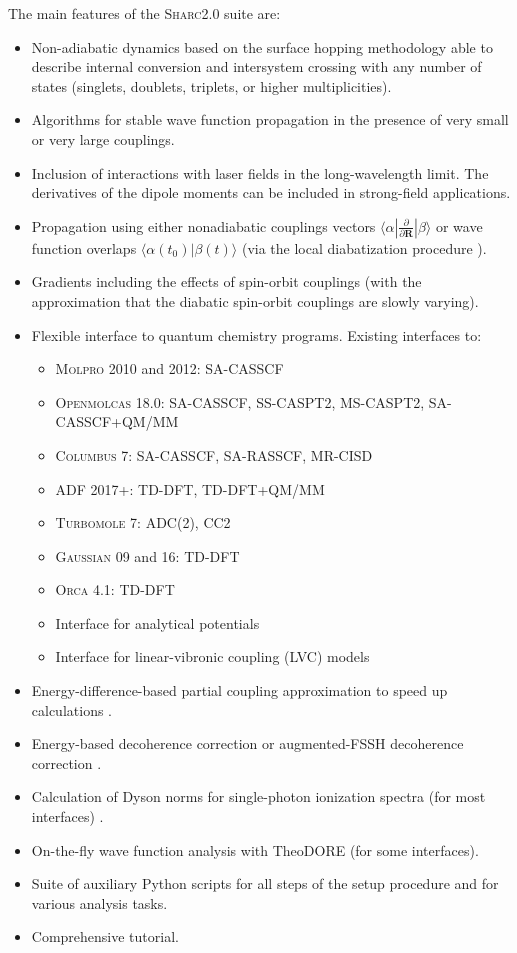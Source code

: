 \documentclass[a4paper,10pt,DIV=15,openany]{scrbook}
\newcommand{\sharc}{\textsc{Sharc}}
\begin{document}
The main features of the \sharc{}2.0 suite are:
\begin{itemize}
  \item Non-adiabatic dynamics based on the surface hopping methodology able to describe internal conversion and intersystem crossing with any number of states (singlets, doublets, triplets, or higher multiplicities).
  \item Algorithms for stable wave function propagation in the presence of very small or very large couplings.
  \item Inclusion of interactions with laser fields in the long-wavelength limit. The derivatives of the dipole moments can be included in strong-field applications.
  \item Propagation using either nonadiabatic couplings vectors $\langle\alpha|\frac{\partial}{\partial \mathbf{R}}|\beta\rangle$ or wave function overlaps $\langle\alpha(t_0)|\beta(t)\rangle$ (via the local diabatization procedure \cite{Granucci2007JCP}).
  \item Gradients including the effects of spin-orbit couplings (with the approximation that the diabatic spin-orbit couplings are slowly varying).
  \item Flexible interface to quantum chemistry programs. Existing interfaces to:
  \begin{itemize}
    \item \textsc{Molpro} 2010 and 2012: SA-CASSCF
    \item \textsc{Openmolcas} 18.0: SA-CASSCF, SS-CASPT2, MS-CASPT2, SA-CASSCF+QM/MM
    \item \textsc{Columbus} 7: SA-CASSCF, SA-RASSCF, MR-CISD
    \item \textsc{ADF} 2017+: TD-DFT, TD-DFT+QM/MM
    \item \textsc{Turbomole} 7: ADC(2), CC2
    \item \textsc{Gaussian} 09 and 16: TD-DFT
    \item \textsc{Orca} 4.1: TD-DFT
    \item Interface for analytical potentials
    \item Interface for linear-vibronic coupling (LVC) models
  \end{itemize}
  \item Energy-difference-based partial coupling approximation to speed up calculations \cite{Pittner2009CP}.
  \item Energy-based decoherence correction \cite{Granucci2007JCP} or augmented-FSSH decoherence correction \cite{Jain2016JCTC}.
  \item Calculation of Dyson norms for single-photon ionization spectra (for most interfaces) \cite{Ruckenbauer2016SR}.
  \item On-the-fly wave function analysis with TheoDORE \cite{Plasser2014JCP1, Plasser2014JCP2, Plasser2017TheoDORE} (for some interfaces).
  \item Suite of auxiliary Python scripts for all steps of the setup procedure and for various analysis tasks.
  \item Comprehensive tutorial.
\end{itemize}
\end{document}
